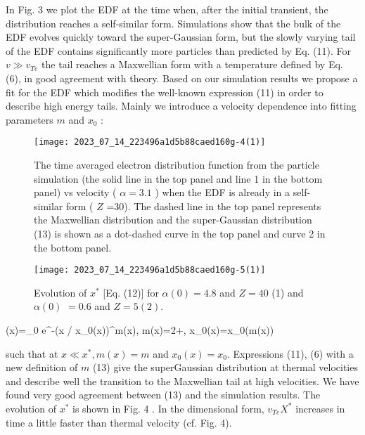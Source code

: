 \documentclass[oneside,onecolumn]{article}
\begin{document}
\begin{sloppypar}
 
 In Fig. 3 we plot the EDF at the time when, after the initial transient, the distribution reaches a self-similar form. Simulations show that the bulk of the EDF evolves quickly toward the super-Gaussian form, but the slowly varying tail of the EDF contains significantly more particles than predicted by Eq. (11). For $v \gg v_{T e}$ the tail reaches a Maxwellian form with a temperature defined by Eq. (6), in good agreement with theory. Based on our simulation results we propose a fit for the EDF which modifies the well-known expression (11) in order to describe high energy tails. Mainly we introduce a velocity dependence into fitting parameters $m$ and $x_{0}$ :%
 \begin{figure}[htbp]
 	\centering
 	\texttt{[image: 2023\_07\_14\_223496a1d5b88caed160g-4(1)]}
 	\caption{The time averaged electron distribution function from the particle simulation (the solid line in the top panel and line 1 in the bottom panel) vs velocity ( $\alpha=3.1$ ) when the EDF is already in a self-similar form ( $Z$ =30). The dashed line in the top panel represents the Maxwellian distribution and the super-Gaussian distribution (13) is shown as a dot-dashed curve in the top panel and curve 2 in the bottom panel.}
 	\label{figure3}
 \end{figure}
 
 \begin{figure}[htbp]
 	\centering
 	\texttt{[image: 2023\_07\_14\_223496a1d5b88caed160g-5(1)]}
 	\caption{Evolution of $x^{*}$ [Eq. (12)] for $\alpha(0)=4.8$ and $Z=40$ (1) and $\alpha(0)$ $=0.6$ and $Z=5(2)$.}
 	\label{figure4}
 \end{figure}
 
 \phi(x)=\phi_{0} e^{-\left(x / x_{0}(x)\right)^{m(x)}},
 m(x)=2+, \quad x_{0}(x)=x_{0}(m(x))
 
 such that at $x \ll x^{*}, m(x)=m$ and $x_{0}(x)=x_{0}$. Expressions (11), (6) with a new definition of $m$ (13) give the superGaussian distribution at thermal velocities and describe well the transition to the Maxwellian tail at high velocities. We have found very good agreement between (13) and the simulation results. The evolution of $x^{*}$ is shown in Fig. 4 . In the dimensional form, $v_{T e} X^{*}$ increases in time a little faster than thermal velocity (cf. Fig. 4).
 

\end{sloppypar}
\end{document}
